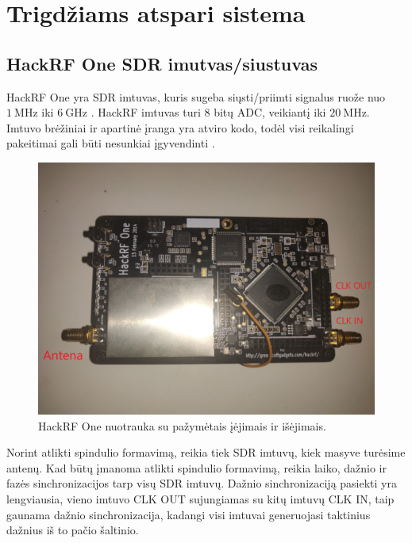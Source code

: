 \documentclass[../gnss_interference_resistant_thesis.tex]{subfiles}
\begin{document}
\section{Trigdžiams atspari sistema}

\subsection{HackRF One SDR imutvas/siustuvas}

HackRF One yra SDR imtuvas, kuris sugeba siųsti/priimti signalus ruože nuo
$1\ \mathrm{MHz}$ iki $6\ \mathrm{GHz}$ \cite{hackrf_one}.
HackRF imtuvas turi 8 bitų ADC, veikiantį iki $20\ \mathrm{MHz}$.
Imtuvo brėžiniai ir apartinė įranga yra atviro kodo, todėl visi
reikalingi pakeitimai gali būti nesunkiai įgyvendinti \cite{hackrf_github}.

\begin{figure}[h]
    \begin{centering}
    \includegraphics[scale=0.1]{drawings/hackrf_img}
    \par\end{centering}
    \protect\caption{\label{fig:hackrf_img}HackRF One nuotrauka su pažymėtais įėjimais ir išėjimais.}
\end{figure}

Norint atlikti spindulio formavimą, reikia tiek SDR imtuvų, kiek masyve
turėsime antenų. Kad būtų įmanoma atlikti spindulio formavimą, reikia laiko, dažnio ir fazės
sinchronizacijos tarp visų SDR imtuvų.
Dažnio sinchronizaciją pasiekti yra lengviausia, vieno imtuvo CLK OUT sujungiamas su
kitų imtuvų CLK IN, taip gaunama dažnio sinchronizacija, kadangi
visi imtuvai generuojasi taktinius dažnius iš to pačio šaltinio.
\end{document}
